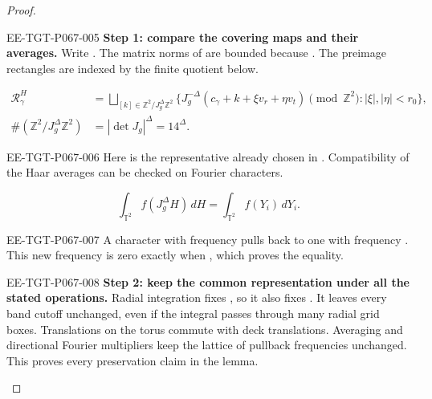 \begin{proof}
\begin{EESegment}{EE-TGT-P067-005}
\textbf{Step 1: compare the covering maps and their averages.} Write . The matrix norms of  are bounded because . The preimage rectangles are indexed by the finite quotient below.
\end{EESegment}
\[
  \begin{aligned}
  \mathcal R_\gamma^H
    &=\bigsqcup_{[k]\in\mathbb Z^2/J_g^\Delta\mathbb Z^2}
      \bigl\{J_g^{-\Delta}(c_\gamma+k+\xi v_r+\eta v_t)
      \pmod{\mathbb Z^2}:|\xi|,|\eta|<r_0\bigr\},\\
  \#(\mathbb Z^2/J_g^\Delta\mathbb Z^2)
    &=|\det J_g|^\Delta=14^\Delta.
  \end{aligned}
\]
\begin{EESegment}{EE-TGT-P067-006}
Here  is the representative already chosen in . Compatibility of the Haar averages can be checked on Fourier characters.
\end{EESegment}
\begin{equation}
  \int_{\mathbb T^2} f(J_g^\Delta H)\,dH
  =\int_{\mathbb T^2} f(Y_i)\,dY_i.
  \tag{6.19}\label{eq:6.19}
\end{equation}
\begin{EESegment}{EE-TGT-P067-007}
A character with frequency  pulls back to one with frequency . This new frequency is zero exactly when , which proves the equality.
\end{EESegment}

\begin{EESegment}{EE-TGT-P067-008}
\textbf{Step 2: keep the common representation under all the stated operations.} Radial integration fixes , so it also fixes . It leaves every band cutoff unchanged, even if the integral passes through many radial grid boxes. Translations on the torus commute with deck translations. Averaging and directional Fourier multipliers keep the lattice of pullback frequencies unchanged. This proves every preservation claim in the lemma.
\end{EESegment}
\end{proof}

